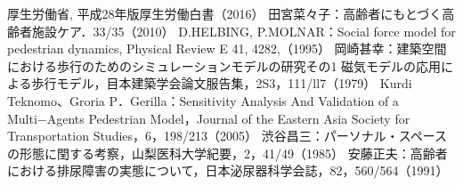 \begin{thebibliography}{99}
  厚生労働省, 平成28年版厚生労働白書（2016）
  田宮菜々子：高齢者にもとづく高齢者施設ケア．33/35（2010）
  D.HELBING, P.MOLNAR：Social force model for pedestrian dynamics, Physical Review E 41, 4282,（1995）
  岡崎甚幸：建築空間における歩行のためのシミュレーションモデルの研究その1 磁気モデルの応用による歩行モデル，目本建築学会論文服告集，2S3，111/ll7（1979）
  Kurdi Teknomo、Groria P．Gerilla：Sensitivity Analysis And Validation of a Multi−Agents Pedestrian Model，Journal of the Eastern Asia Society for Transportation Studies，6，198/213（2005）
  渋谷昌三：パーソナル・スペースの形態に閏する考察，山梨医科大学紀要，2，41/49（1985）
  安藤正夫：高齢者における排尿障害の実態について，日本泌尿器科学会誌，82，560/564（1991）
\end{thebibliography}

